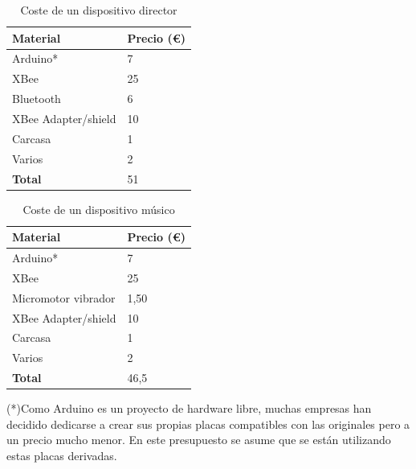   \begin{table}[h]
  \centering
  \label{table:costodirector}
  \begin{tabular}{ll}
  \hline
  \rowcolor[HTML]{9698ED}
  {\bf Material}      & {\bf Precio (\euro)} \\ \hline
  Arduino*            & 7                \\
  XBee                & 25               \\
  Bluetooth           & 6                \\
  XBee Adapter/shield & 10               \\
  Carcasa             & 1                \\
  Varios              & 2                \\
  \rowcolor[HTML]{CBCEFB}
  {\bf Total}         & 51              \\ \hline
  \end{tabular}
      \caption{Coste de un dispositivo director}
  \end{table}



  \begin{table}[h]
  \centering
  \label{table:costomusico}
  \begin{tabular}{ll}
  \hline
  \rowcolor[HTML]{9698ED}
  {\bf Material}      & {\bf Precio (\euro)} \\ \hline
  Arduino*            & 7                \\
  XBee                & 25               \\
  Micromotor vibrador & 1,50             \\
  XBee Adapter/shield & 10               \\
  Carcasa             & 1                \\
  Varios              & 2                \\
  \rowcolor[HTML]{CBCEFB}
  {\bf Total}         & 46,5               \\ \hline
  \end{tabular}
    \caption{Coste de un dispositivo músico}
  \end{table}


(*)Como Arduino es un proyecto de hardware libre, muchas empresas han decidido
dedicarse a crear sus propias placas compatibles con las originales pero a un
precio mucho menor. En este presupuesto se asume que se están utilizando estas
placas derivadas.\\

